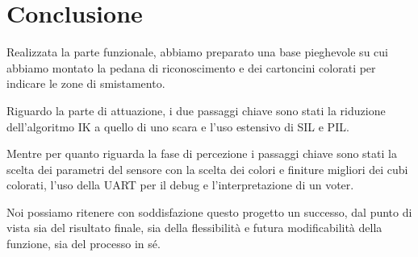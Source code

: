 \documentclass[12pt]{report}
\begin{document}
\chapter{Conclusione}

Realizzata la parte funzionale, abbiamo preparato una base pieghevole su cui abbiamo montato la pedana di riconoscimento e dei cartoncini colorati per indicare le zone di smistamento.

Riguardo la parte di attuazione, i due passaggi chiave sono stati la riduzione dell'algoritmo IK a quello di uno scara e l'uso estensivo di SIL e PIL.

Mentre per quanto riguarda la fase di percezione i passaggi chiave sono stati la scelta dei parametri del sensore con la scelta dei colori e finiture migliori dei cubi colorati, l'uso della UART per il debug e l'interpretazione di un voter.

Noi possiamo ritenere con soddisfazione questo progetto un successo, dal punto di vista sia del risultato finale, sia della flessibilità e futura modificabilità della funzione, sia del processo in sé.
\end{document}

